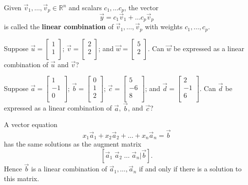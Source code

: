 \begin{enumerate}
\begin{defn} Given $\vec{v}_1,\dots, \vec{v}_p \in \mathbb{R}^n$ and scalars $c_1, \dots c_p$, the vector $$\vec{y} = c_1 \vec{v}_1 +\dots c_p \vec{v}_p$$ is called the {\bf linear combination} of $\vec{v}_1,\dots, \vec{v}_p$ with weights $c_1,\dots,c_p$.
\end{defn}

\Problem Suppose $\vec{u} =\begin{bmatrix} 1\\1\\ \end{bmatrix}$;  $\vec{v} =\begin{bmatrix} 2\\2\\ \end{bmatrix}$; and  $\vec{w} =\begin{bmatrix} 5\\2\\ \end{bmatrix}$. Can $\vec{w}$ be expressed as a linear combination of $\vec{u}$ and $\vec{v}$?


\newpage

\Problem Suppose $\vec{a} =\begin{bmatrix} 1\\-1\\ 0\\ \end{bmatrix}$; $\vec{b} =\begin{bmatrix} 0\\1\\ 2\\ \end{bmatrix}$; $\vec{c} =\begin{bmatrix} 5\\-6\\8\\ \end{bmatrix}$; and  $\vec{d} =\begin{bmatrix} 2\\-1\\6\\ \end{bmatrix}$. Can $\vec{d}$ be expressed as a linear combination of $\vec{a}$, $\vec{b}$, and $\vec{c}$?


\newpage

A vector equation $$x_1 \vec{a}_1 + x_2 \vec{a}_2 +\dots + x_n \vec{a}_n =\vec{b}$$ has the same solutions as the augment matrix $$[\vec{a}_1 \; \vec{a}_2 \; \dots \; \vec{a}_n \Big| \vec{b}].$$ Hence $\vec{b}$ is a linear combination of $\vec{a}_1, \dots, \vec{a}_n$ if and only if there is a solution to this matrix.


\end{enumerate}

